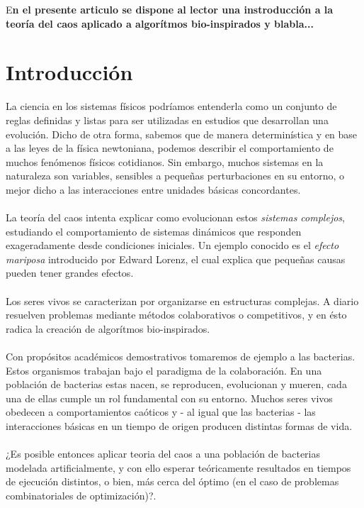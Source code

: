 \documentclass[DIV=calc, paper=a4, fontsize=11pt, twocolumn]{scrartcl}	 %
\title{} %
\author{Cristobal Donoso Oliva, Matias Medina Silva} %
\date{} %
\newcommand{\initial}[1]{ %
\lettrine[lines=3,lhang=0.3,nindent=0em]{
\color{DarkGoldenrod}
{\textsf{#1}}}{}}
\begin{document}
\maketitle %

\thispagestyle{fancy} %


\initial{E}\textbf{n el presente articulo se dispone al lector una instroducción a la teoría del caos aplicado a algorítmos bio-inspirados y blabla...}


\section*{Introducción}
La ciencia en los sistemas físicos podríamos entenderla como un conjunto de reglas definidas y listas para ser utilizadas en estudios que desarrollan una evolución. Dicho de otra forma, sabemos que de manera determinística y en base a las leyes de la física newtoniana, podemos describir el comportamiento de muchos fenómenos físicos cotidianos. Sin embargo, muchos sistemas en la naturaleza son variables, sensibles a pequeñas perturbaciones en su entorno, o mejor dicho a las interacciones entre unidades básicas concordantes.\\\\La teoría del caos intenta explicar como evolucionan estos \emph{sistemas complejos}, estudiando el comportamiento de sistemas dinámicos que responden exageradamente desde condiciones iniciales. Un ejemplo conocido es el \emph{efecto mariposa} introducido por Edward Lorenz, el cual explica que pequeñas causas pueden tener grandes efectos.\\\\Los seres vivos se caracterizan por organizarse en estructuras complejas. A diario resuelven problemas mediante métodos colaborativos o competitivos, y en ésto radica la creación de algorítmos bio-inspirados.\\\\Con propósitos académicos demostrativos tomaremos de ejemplo a las bacterias. Estos organismos trabajan bajo el paradigma de la colaboración. En una población de bacterias estas nacen, se reproducen, evolucionan y mueren, cada una de ellas cumple un rol fundamental con su entorno. Muchos seres vivos obedecen a comportamientos caóticos y - al igual que las bacterias - las interacciones básicas en un tiempo de origen producen distintas formas de vida.\\\\¿Es posible entonces aplicar teoria del caos a una población de bacterias modelada artificialmente, y con ello esperar teóricamente resultados en tiempos de ejecución distintos, o bien, más cerca del óptimo (en el caso de problemas combinatoriales de optimización)?.
\end{document}

